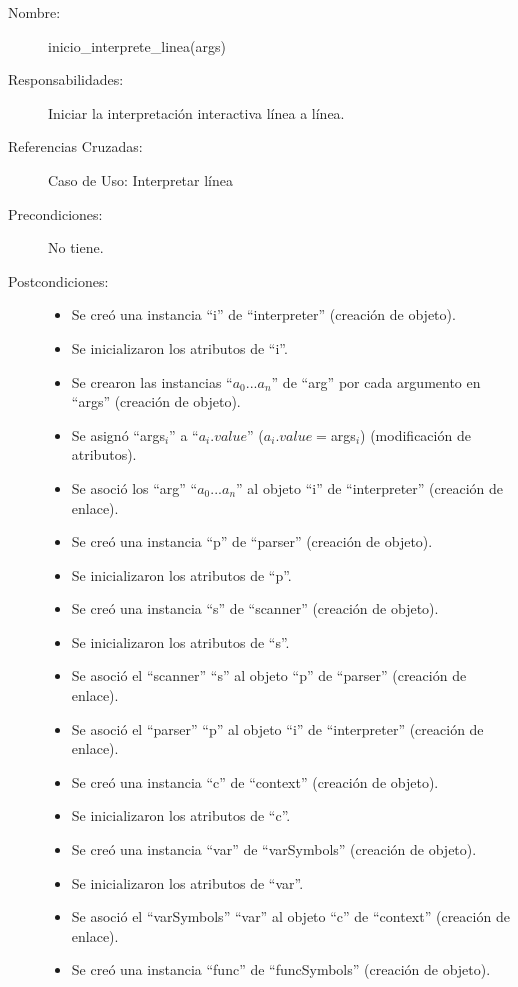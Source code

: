 	\begin{description}
		\item [Nombre:] inicio\_interprete\_linea(args)
		\item [Responsabilidades:] Iniciar la interpretación interactiva línea a línea.
		\item [Referencias Cruzadas: ] Caso de Uso: Interpretar línea
      \item [Precondiciones:] No tiene.
      \item [Postcondiciones:] \hfill
      \begin {itemize}
         \item Se creó una instancia ``i'' de ``interpreter'' (creación de objeto).
         \item Se inicializaron los atributos de ``i''.
         \item Se crearon las instancias ``$a_0...a_n$'' de ``arg'' por cada argumento en ``args'' (creación de objeto).
         \item Se asignó ``args$_i$'' a ``$a_i.value$'' ($a_i.value = $args$_i$) (modificación de atributos).
         \item Se asoció los ``arg'' ``$a_0...a_n$'' al objeto ``i'' de ``interpreter'' (creación de enlace).
         \item Se creó una instancia ``p'' de ``parser'' (creación de objeto).
         \item Se inicializaron los atributos de ``p''.
         \item Se creó una instancia ``s'' de ``scanner'' (creación de objeto).
         \item Se inicializaron los atributos de ``s''.
         \item Se asoció el ``scanner'' ``s'' al objeto ``p'' de ``parser'' (creación de enlace).
         \item Se asoció el ``parser'' ``p'' al objeto ``i'' de ``interpreter'' (creación de enlace).
         \item Se creó una instancia ``c'' de ``context'' (creación de objeto).
         \item Se inicializaron los atributos de ``c''.
         \item Se creó una instancia ``var'' de ``varSymbols'' (creación de objeto).
         \item Se inicializaron los atributos de ``var''.
         \item Se asoció el ``varSymbols'' ``var'' al objeto ``c'' de ``context'' (creación de enlace).
         \item Se creó una instancia ``func'' de ``funcSymbols'' (creación de objeto).

\end{itemize}
\end{description}
